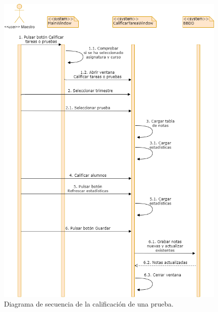 \begin{figure}[h]
\centering\includegraphics[width=1\linewidth]{figs/dia_calificarprueba.png}
\caption{Diagrama de secuencia de la calificación de una prueba.}
\label{Fig:dia_calificarprueba}
\end{figure}

